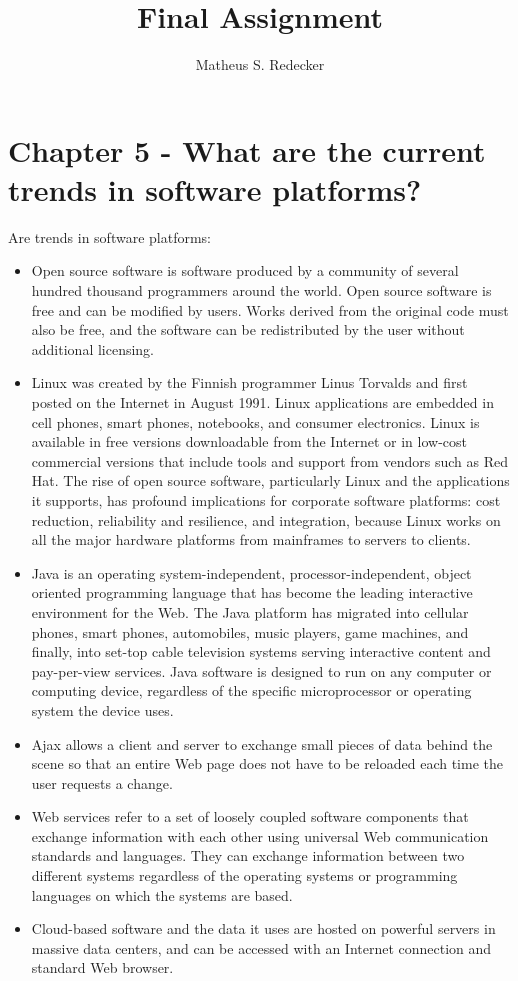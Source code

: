 \documentclass[12pt]{article}
\title{Final Assignment}
\author{Matheus S. Redecker\inst{1} }
\begin{document}
 

\maketitle

\section{Chapter 5 - What are the current trends in software platforms?}
Are trends in software platforms:
\begin{itemize}
    \item Open source software is software produced by a community of several hundred thousand programmers around the world. Open source software is free and can be modified by users. Works derived from the original code must also be free, and the software can be redistributed by the user without additional licensing. 
    \item Linux was created by the Finnish programmer Linus Torvalds and first posted on the Internet in August 1991. Linux applications are embedded in cell phones, smart phones, notebooks, and consumer electronics. Linux is available in free versions downloadable from the Internet or in low-cost commercial versions that include tools and support from vendors such as Red Hat. The rise of open source software, particularly Linux and the applications it supports, has profound implications for corporate software platforms: cost reduction, reliability and resilience, and integration, because Linux works on all the major hardware platforms from mainframes to servers to clients.
    \item Java is an operating system-independent, processor-independent, object oriented programming language that has become the leading interactive environment for the Web. The Java platform has migrated into cellular phones, smart phones, automobiles, music players, game machines, and finally, into set-top cable television systems serving interactive content and pay-per-view services. Java software is designed to run on any computer or computing device, regardless of the specific microprocessor or operating system the device uses. 
    \item Ajax allows a client and server to exchange small pieces of data behind the scene so that an entire Web page does not have to be reloaded each time the user requests a change. 
    \item Web services refer to a set of loosely coupled software components that exchange information with each other using universal Web communication standards and languages. They can exchange information between two different systems regardless of the operating systems or programming languages on which the systems are based. 
    \item Cloud-based software and the data it uses are hosted on powerful servers in massive data centers, and can be accessed with an Internet connection and standard Web browser. 
\end{itemize}
\end{document}
